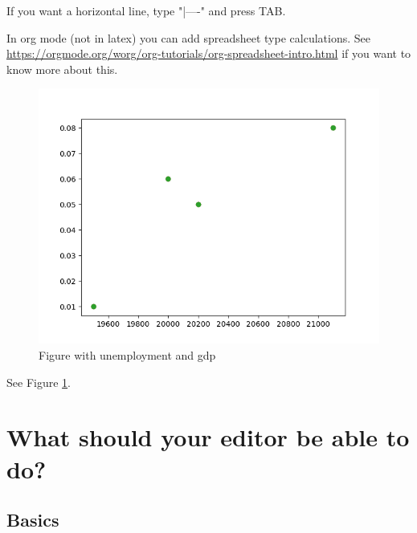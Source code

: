 \documentclass[11pt]{article}
\begin{document}
If you want a horizontal line, type "|----" and press TAB.

In org mode (not in latex) you can add spreadsheet type calculations. See \url{https://orgmode.org/worg/org-tutorials/org-spreadsheet-intro.html} if you want to know more about this.


\begin{figure}[htbp]
\centering
\includegraphics[width=.9\linewidth]{./fig.png}
\caption{\label{fig:org5acee25}\label{figure1} Figure with unemployment and gdp}
\end{figure}

See Figure \ref{figure1}.

\section{What should your editor be able to do?}
\label{sec:org8b1c9fe}

\subsection{Basics}
\label{sec:org9488e8c}
\end{document}
